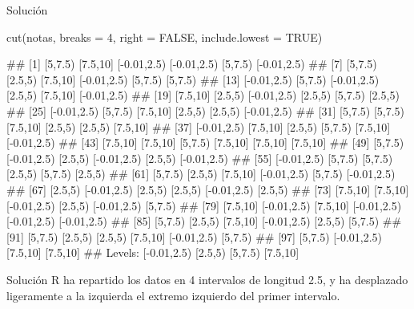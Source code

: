 \documentclass[
  ignorenonframetext,
  aspectratio=169]{beamer}
\newenvironment{Shaded}{\begin{snugshade}}{\end{snugshade}}
\newcommand{\AttributeTok}[1]{\textcolor[rgb]{0.77,0.63,0.00}{#1}}
\newcommand{\ConstantTok}[1]{\textcolor[rgb]{0.00,0.00,0.00}{#1}}
\newcommand{\DecValTok}[1]{\textcolor[rgb]{0.00,0.00,0.81}{#1}}
\newcommand{\FunctionTok}[1]{\textcolor[rgb]{0.00,0.00,0.00}{#1}}
\newcommand{\NormalTok}[1]{#1}
\let\oldverbatim\verbatim
\let\endoldverbatim\endverbatim
\renewenvironment{verbatim}{\tiny\oldverbatim}{\endoldverbatim}
\begin{document}
\begin{frame}[fragile]{Solución}
\protect\hypertarget{soluciuxf3n-23}{}
\begin{Shaded}
\begin{Highlighting}[]
\FunctionTok{cut}\NormalTok{(notas, }\AttributeTok{breaks =} \DecValTok{4}\NormalTok{, }\AttributeTok{right =} \ConstantTok{FALSE}\NormalTok{, }\AttributeTok{include.lowest =} \ConstantTok{TRUE}\NormalTok{)}
\end{Highlighting}
\end{Shaded}

\begin{verbatim}
##   [1] [5,7.5)     [7.5,10]    [-0.01,2.5) [-0.01,2.5) [5,7.5)     [-0.01,2.5)
##   [7] [5,7.5)     [2.5,5)     [7.5,10]    [-0.01,2.5) [5,7.5)     [5,7.5)    
##  [13] [-0.01,2.5) [5,7.5)     [-0.01,2.5) [2.5,5)     [7.5,10]    [-0.01,2.5)
##  [19] [7.5,10]    [2.5,5)     [-0.01,2.5) [2.5,5)     [5,7.5)     [2.5,5)    
##  [25] [-0.01,2.5) [5,7.5)     [7.5,10]    [2.5,5)     [2.5,5)     [-0.01,2.5)
##  [31] [5,7.5)     [5,7.5)     [7.5,10]    [2.5,5)     [2.5,5)     [7.5,10]   
##  [37] [-0.01,2.5) [7.5,10]    [2.5,5)     [5,7.5)     [7.5,10]    [-0.01,2.5)
##  [43] [7.5,10]    [7.5,10]    [5,7.5)     [7.5,10]    [7.5,10]    [7.5,10]   
##  [49] [5,7.5)     [-0.01,2.5) [2.5,5)     [-0.01,2.5) [2.5,5)     [-0.01,2.5)
##  [55] [-0.01,2.5) [5,7.5)     [5,7.5)     [2.5,5)     [5,7.5)     [2.5,5)    
##  [61] [5,7.5)     [2.5,5)     [7.5,10]    [-0.01,2.5) [5,7.5)     [-0.01,2.5)
##  [67] [2.5,5)     [-0.01,2.5) [2.5,5)     [2.5,5)     [-0.01,2.5) [2.5,5)    
##  [73] [7.5,10]    [7.5,10]    [-0.01,2.5) [2.5,5)     [-0.01,2.5) [5,7.5)    
##  [79] [7.5,10]    [-0.01,2.5) [7.5,10]    [-0.01,2.5) [-0.01,2.5) [-0.01,2.5)
##  [85] [5,7.5)     [2.5,5)     [7.5,10]    [-0.01,2.5) [2.5,5)     [5,7.5)    
##  [91] [5,7.5)     [2.5,5)     [2.5,5)     [7.5,10]    [-0.01,2.5) [5,7.5)    
##  [97] [5,7.5)     [-0.01,2.5) [7.5,10]    [7.5,10]   
## Levels: [-0.01,2.5) [2.5,5) [5,7.5) [7.5,10]
\end{verbatim}
\end{frame}

\begin{frame}{Solución}
\protect\hypertarget{soluciuxf3n-24}{}
R ha repartido los datos en 4 intervalos de longitud 2.5, y ha
desplazado ligeramente a la izquierda el extremo izquierdo del primer
intervalo.
\end{frame}
\end{document}
